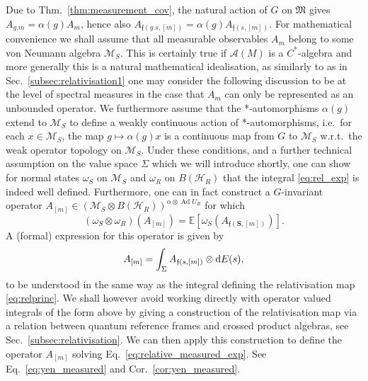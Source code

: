 \documentclass[sn-mathphys-num]{sn-jnl}%
\newcommand{\HH}{\mathcal{H}}
\newcommand{\MM}{\mathcal{M}}
\newcommand{\Af}{\mathscr{A}}
\DeclareMathOperator{\Ad}{Ad}
\newcommand{\diff}{\textup{d}}
\numberwithin{equation}{section}
\theoremstyle{thmstyleone}%
\theoremstyle{thmstyletwo}%
\theoremstyle{thmstylethree}%
\begin{document}
Due to Thm.\ \ref{thm:measurement_cov}, the natural action of $G$ on $\mathfrak{M}$ gives $A_{g.m}=\alpha(g)A_m$, hence also $A_{\mathfrak{f}(g.s,[m])}=\alpha(g)A_{\mathfrak{f}(s,[m])}$. For mathematical convenience we shall assume that all measurable observables $A_m$ belong to some von Neumann algebra $\MM_S$. This is certainly true if $\Af(M)$ is a $C^*$-algebra and more generally this is a natural mathematical idealisation, as similarly to as in Sec.~\ref{subsec:relativisation1} one may consider the following discussion to be at the level of spectral measures in the case that $A_m$ can only be represented as an unbounded operator. We furthermore assume that the *-automorphisms $\alpha(g)$ extend to $\MM_S$ to define a weakly continuous action of *-automorphisms,   i.e.~for each $x\in \MM_S$, the map $g\mapsto \alpha(g)x$ is a continuous map from $G$ to $\MM_S$ w.r.t.~the weak operator topology on $\MM_S$.  Under these conditions, and a further technical assumption on the value space $\Sigma$ which we will introduce shortly, one can show for normal states $\omega_S$ on $\MM_S$ and $\omega_R$ on $B(\HH_R)$ that the integral \eqref{eq:rel_exp} is indeed well defined. Furthermore, one can in fact construct a $G$-invariant operator $A_{[m]}\in (\MM_S\otimes B(\HH_R))^{\alpha\otimes\Ad U_R}$ for which 
\begin{equation}
    \label{eq:relative_measured_exp}
    (\omega_S\otimes \omega_R)(A_{[m]})=\mathds{E}[\omega_S(A_{\mathfrak{f}(\mathbf{S},[m])})].
\end{equation}
A (formal) expression for this operator is given by
\begin{equation}
\label{eq:relative_measured}
    A_{[m]}=\int_\Sigma  A_{\mathfrak{f}(s,[m])}\otimes \diff E(s),
\end{equation}
to be understood in the same way as the integral defining the relativisation map \eqref{eq:relprinc}. We shall however avoid working directly with operator valued integrals of the form above by giving a construction of the relativisation map via a relation between quantum reference frames and crossed product algebras, see Sec.\ \ref{subsec:relativisation}. We can then apply this construction to define the operator $A_{[m]}$ solving Eq.~\eqref{eq:relative_measured_exp}. See Eq.\ \eqref{eq:yen_measured} and Cor.~\ref{cor:yen_measured}.
\end{document}
